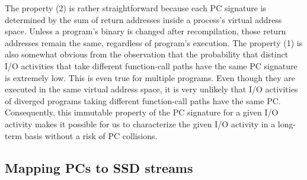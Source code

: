 The property (2) is rather straightforward because each PC signature is 
determined by the sum of return addresses inside a process's
virtual address space.  Unless a program's binary is changed after
recompilation, those return addresses remain the same, regardless of program's
execution.  
The property (1) is also somewhat obvious from the observation
that the probability that distinct I/O activities that take
different function-call paths have the same PC signature is extremely low. This
is even true for multiple programs. Even though they are executed in the same
virtual address space, it is very unlikely that I/O activities of diverged
programs taking different function-call paths have the same PC.  
Consequently, this immutable property of
the PC signature for a given I/O activity makes it possible for us to characterize 
the given I/O activity in a long-term basis without a risk of PC collisions.


\vspace{-10pt}
\subsection{Mapping PCs to SSD streams}
\vspace{-5pt}

